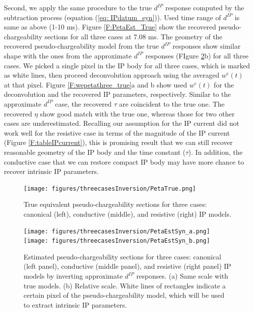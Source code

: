 \documentclass[a4paper, 11pt]{article}
\newcommand{\dip}{d^{IP}}
\begin{document}
Second, we apply the same procedure to the true $\dip$ response computed by the subtraction process (equation (\ref{eq: IPdatum_syn})). Used time range of $\dip$ is same as above (1-10 ms). Figure \ref{F:PetaEst_True} show the recovered pseudo-chargeability sections for all three cases at 7.08 ms. The geometry of the recovered pseudo-chargeability model from the true $\dip$ responses show similar shape with the ones from the approximate $\dip$ responses (FIgure \ref{F:PetaEstSyn}b) for all three cases. We picked a single pixel in the IP body for all three cases, which is marked as white lines, then proceed deconvolution approach using the averaged $w^e(t)$ at that pixel. Figure \ref{F:wepetathree_true}a and b show used $w^e(t)$ for the deconvolution and the recovered IP parameters, respectively. Similar to the approximate $\dip$ case, the recovered $\tau$ are coincident to the true one. The recovered $\eta$ show good match with the true one, whereas those for two other cases are underestimated. Recalling our assumption for the IP current did not work well for the resistive case in terms of the magnitude of the IP current (Figure \ref{F:tableIPcurrent}), this is promising result that we can still recover reasonable geometry of the IP body and the time constant ($\tau$). In addition, the conductive case that we can restore compact IP body may have more chance to recover intrinsic IP parameters. 

\begin{figure}[htb]
  \centering \texttt{[image: figures/threecasesInversion/PetaTrue.png]}
  \caption{True equivalent pseudo-chargeability sections for three cases: canonical (left), conductive (middle), and resistive (right) IP models. }
  \label{F:PetaTrue}
\end{figure}

\begin{figure}[htb]
  \centering 
  \texttt{[image: figures/threecasesInversion/PetaEstSyn\_a.png]} \\
  \texttt{[image: figures/threecasesInversion/PetaEstSyn\_b.png]}
  \caption{Estimated pseudo-chargeability sections for three cases: canonical (left panel), conductive (middle panel), and resistive (right panel) IP models by inverting approximate $\dip$ responses. (a) Same scale with true models. (b) Relative scale. White lines of rectangles indicate a certain pixel of the pseudo-chargeability model, which will be used to extract intrinsic IP parameters. }
  \label{F:PetaEstSyn}
\end{figure}
\end{document}

